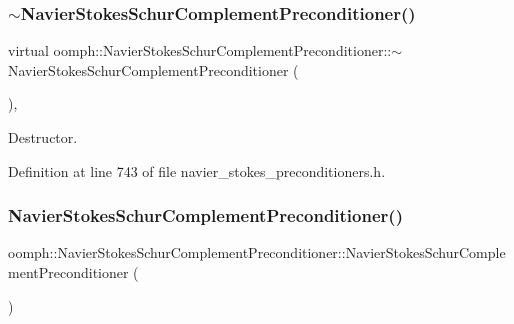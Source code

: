 \subsubsection{\texorpdfstring{$\sim$\+Navier\+Stokes\+Schur\+Complement\+Preconditioner()}{~NavierStokesSchurComplementPreconditioner()}}
{\footnotesize\ttfamily virtual oomph\+::\+Navier\+Stokes\+Schur\+Complement\+Preconditioner\+::$\sim$\+Navier\+Stokes\+Schur\+Complement\+Preconditioner (\begin{DoxyParamCaption}{ }\end{DoxyParamCaption})\hspace{0.3cm}{\ttfamily [inline]}, {\ttfamily [virtual]}}



Destructor. 



Definition at line 743 of file navier\+\_\+stokes\+\_\+preconditioners.\+h.

\mbox{\label{classoomph_1_1NavierStokesSchurComplementPreconditioner_a3597811461decb5beec486bce3de36cd}} 
\subsubsection{\texorpdfstring{Navier\+Stokes\+Schur\+Complement\+Preconditioner()}{NavierStokesSchurComplementPreconditioner()}\hspace{0.1cm}{\footnotesize\ttfamily [2/2]}}
{\footnotesize\ttfamily oomph\+::\+Navier\+Stokes\+Schur\+Complement\+Preconditioner\+::\+Navier\+Stokes\+Schur\+Complement\+Preconditioner (\begin{DoxyParamCaption}\item[{const \hyperlink{classoomph_1_1NavierStokesSchurComplementPreconditioner}{Navier\+Stokes\+Schur\+Complement\+Preconditioner} \&}]{ }\end{DoxyParamCaption})\hspace{0.3cm}{\ttfamily [inline]}}



